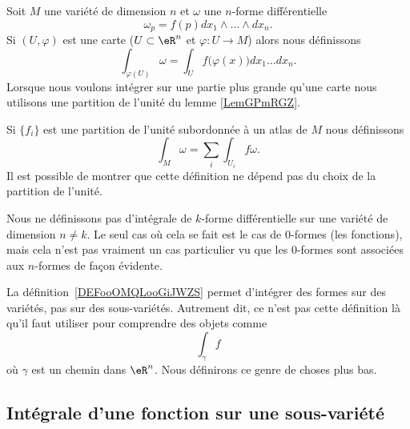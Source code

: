 Soit \( M\) une variété de dimension \( n\) et \( \omega\) une \( n\)-forme différentielle
\begin{equation}
    \omega_p=f(p)dx_1\wedge\ldots\wedge dx_n.
\end{equation}
 Si \( (U,\varphi)\) est une carte (\( U\subset\eR^n\) et \( \varphi\colon U\to M\)) alors nous définissons
\begin{equation}
    \int_{\varphi(U)}\omega=\int_{U}f\big( \varphi(x) \big)dx_1\ldots dx_n.
\end{equation}
Lorsque nous voulons intégrer sur une partie plus grande qu'une carte nous utilisons une partition de l'unité du lemme \ref{LemGPmRGZ}. 


\begin{definition}       \label{DEFooOMQLooGiJWZS}
    Si \( \{ f_i \}\) est une partition de l'unité subordonnée à un atlas de \( M\) nous définissons
    \begin{equation}
        \int_M\omega=\sum_i\int_{U_i}f\omega.
    \end{equation}
    Il est possible de montrer que cette définition ne dépend pas du choix de la partition de l'unité.
\end{definition}

\begin{remark}
    Nous ne définissons pas d'intégrale de \( k\)-forme différentielle sur une variété de dimension \( n\neq k\). Le seul cas où cela se fait est le cas de \( 0\)-formes (les fonctions), mais cela n'est pas vraiment un cas particulier vu que les \( 0\)-formes sont associées aux \( n\)-formes de façon évidente.
\end{remark}

\begin{remark}
    La définition~\ref{DEFooOMQLooGiJWZS} permet d'intégrer des formes sur des variétés, pas sur des sous-variétés. Autrement dit, ce n'est pas cette définition là qu'il faut utiliser pour comprendre des objets comme
    \begin{equation}
        \int_{\gamma}f
    \end{equation}
    où \( \gamma\) est un chemin dans \( \eR^n\). Nous définirons ce genre de choses plus bas.
\end{remark}

\subsection{Intégrale d'une fonction sur une sous-variété}

